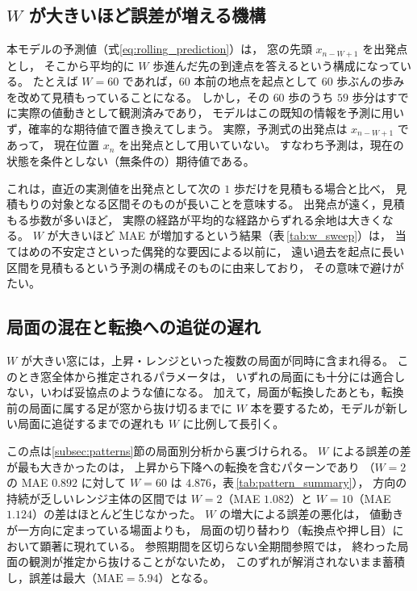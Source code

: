 \documentclass[a4j,dvipdfmx]{jsarticle}
\theoremstyle{plainnote}
\begin{document}
\subsection{$W$ が大きいほど誤差が増える機構}\label{subsec:disc_mech}

本モデルの予測値（式\eqref{eq:rolling_prediction}）は，
窓の先頭 $x_{n-W+1}$ を出発点とし，
そこから平均的に $W$ 歩進んだ先の到達点を答えるという構成になっている。
たとえば $W=60$ であれば，$60$ 本前の地点を起点として
$60$ 歩ぶんの歩みを改めて見積もっていることになる。
しかし，その $60$ 歩のうち $59$ 歩分はすでに実際の値動きとして観測済みであり，
モデルはこの既知の情報を予測に用いず，確率的な期待値で置き換えてしまう。
実際，予測式の出発点は $x_{n-W+1}$ であって，
現在位置 $x_n$ を出発点として用いていない。
すなわち予測は，現在の状態を条件としない（無条件の）期待値である。

これは，直近の実測値を出発点として次の $1$ 歩だけを見積もる場合と比べ，
見積もりの対象となる区間そのものが長いことを意味する。
出発点が遠く，見積もる歩数が多いほど，
実際の経路が平均的な経路からずれる余地は大きくなる。
$W$ が大きいほど MAE が増加するという結果（表\,\ref{tab:w_sweep}）は，
当てはめの不安定さといった偶発的な要因による以前に，
遠い過去を起点に長い区間を見積もるという予測の構成そのものに由来しており，
その意味で避けがたい。

\subsection{局面の混在と転換への追従の遅れ}\label{subsec:disc_mix}

$W$ が大きい窓には，上昇・レンジといった複数の局面が同時に含まれ得る。
このとき窓全体から推定されるパラメータは，
いずれの局面にも十分には適合しない，いわば妥協点のような値になる。
加えて，局面が転換したあとも，転換前の局面に属する足が窓から抜け切るまでに
$W$ 本を要するため，モデルが新しい局面に追従するまでの遅れも
$W$ に比例して長引く。

この点は\ref{subsec:patterns}節の局面別分析から裏づけられる。
$W$ による誤差の差が最も大きかったのは，
上昇から下降への転換を含むパターンであり
（$W=2$ の MAE $0.892$ に対して $W=60$ は $4.876$，表\,\ref{tab:pattern_summary}），
方向の持続が乏しいレンジ主体の区間では
$W=2$（MAE $1.082$）と $W=10$（MAE $1.124$）の差はほとんど生じなかった。
$W$ の増大による誤差の悪化は，
値動きが一方向に定まっている場面よりも，
局面の切り替わり（転換点や押し目）において顕著に現れている。
参照期間を区切らない全期間参照では，
終わった局面の観測が推定から抜けることがないため，
このずれが解消されないまま蓄積し，誤差は最大（$\mathrm{MAE}=5.94$）となる。
\end{document}
